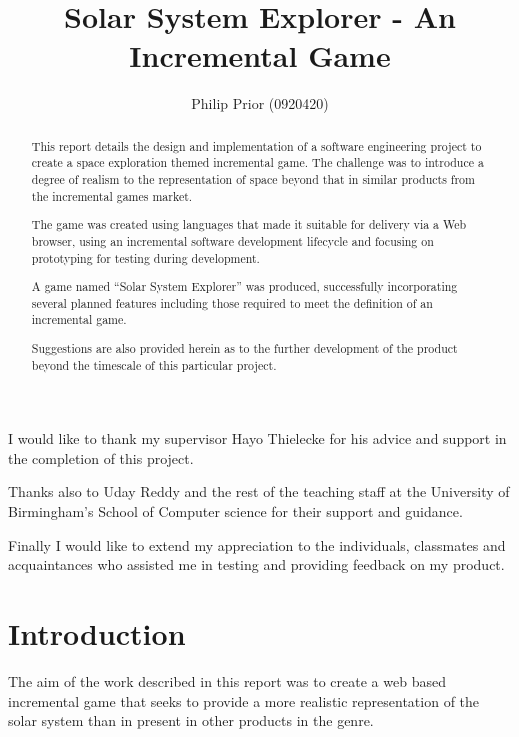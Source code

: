 \documentclass[twoside]{bhamthesis}
\title{Solar System Explorer - An Incremental Game}
\author{Philip Prior (0920420)}
\begin{document}
\maketitle
\clearemptydoublepage

\tableofcontents

\begin{abstract}

This report details the design and implementation of a software engineering project to create a space exploration themed incremental game. The challenge was to introduce a degree of realism to the representation of space beyond that in similar products from the incremental games market.

The game was created using languages that made it suitable for delivery via a Web browser, using an incremental software development lifecycle and focusing on prototyping for testing during development.

A game named “Solar System Explorer” was produced, successfully incorporating several planned features including those required to meet the definition of an incremental game.

Suggestions are also provided herein as to the further development of the product beyond the timescale of this particular project.

\end{abstract}

\begin{acknowledgments}
I would like to thank my supervisor Hayo Thielecke for his advice and support in the completion of this project.

Thanks also to Uday Reddy and the rest of the teaching staff at the University of Birmingham's School of Computer science for their support and guidance.

Finally I would like to extend my appreciation to the individuals, classmates and acquaintances who assisted me in testing and providing feedback on my product.
\end{acknowledgments}


\section{Introduction}

The aim of the work described in this report was to create a web based incremental game that seeks to provide a more realistic representation of the solar system than in present in other products in the genre.
\end{document}
